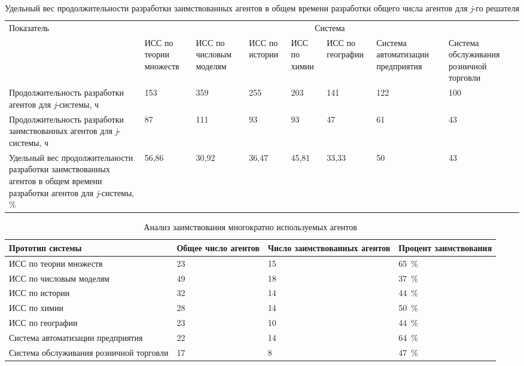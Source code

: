 \documentclass{thesisby}
\begin{document}
\begin{table} [H]
  \small
  \caption{\hangindent=33mm  Удельный вес продолжительности разработки заимствованных агентов в общем времени разработки общего числа агентов для \textit{j}-го решателя}\label{AgentsPercentTable}
\begin{tabularx}{\hsize}{| p{3.6cm} | X | X | X | X | X | X | X |}
  \hline
 \multirow{2}{*}{Показатель} &\multicolumn{7}{c|}{Система}\\
 \cline{2-8}
 & ИСС по теории множеств & ИСС по числовым моделям	& ИСС по истории	& ИСС по химии	& ИСС по географии	& Система автоматизации предприятия	& Система обслуживания розничной торговли\\
\hline
Продолжительность разработки агентов для \textit{j}-системы, ч & 153 & 359 & 255 & 203 & 141 & 122 & 100\\
\hline
Продолжительность разработки заимствованных агентов для \textit{j}-системы, ч & 87 & 111 & 93 & 93 & 47 & 61 & 43\\
\hline
Удельный вес продолжительности разработки заимствованных агентов в общем времени разработки агентов для \textit{j}-системы, \% & 56,86 & 30,92 & 36,47 & 45,81 & 33,33 & 50 & 43\\
\hline

\end{tabularx}
\end{table}


\begin{table} [H]
  \small
  \caption{Анализ заимствования многократно используемых агентов}\label{LibraryUseTable}
\begin{tabularx}{\hsize}{| X | X | X | X |}
  \hline
 Прототип системы & Общее число агентов & Число заимствованных агентов & Процент заимствования\\
\hline
ИСС по теории множеств & 23 & 15 & 65~\%\\
\hline
ИСС по числовым моделям & 49 & 18 & 37~\%\\
\hline
ИСС по истории & 32 & 14 & 44~\%\\ 
\hline
ИСС по химии & 28 & 14 & 50~\%\\
\hline
ИСС по географии & 23 & 10 & 44~\%\\
\hline
Система автоматизации предприятия & 22 & 14 & 64~\% \\
\hline
Система обслуживания розничной торговли & 17 & 8 & 47~\% \\
\hline
\end{tabularx}
\end{table}
\end{document}
